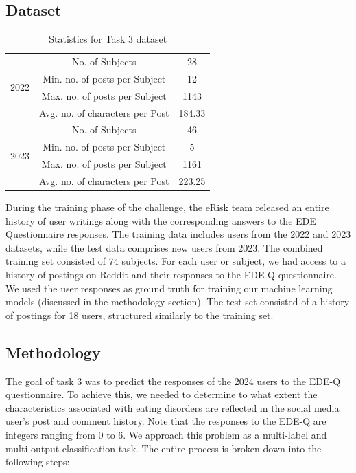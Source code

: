 \documentclass[]{style/ceurart}
\begin{document}
\subsection{Dataset}

\begin{table}[h!]
\centering
\caption{Statistics for Task 3 dataset}
\begin{tabular}{|c|c|c|}
\hline
\multirow{4}{*}{2022} & No. of Subjects                 & 28     \\ \cline{2-3} 
                      & Min. no. of posts per Subject   & 12     \\ \cline{2-3} 
                      & Max. no. of posts per Subject   & 1143   \\ \cline{2-3} 
                      & Avg. no. of characters per Post & 184.33 \\ \hline
\multirow{4}{*}{2023} & No. of Subjects                 & 46     \\ \cline{2-3} 
                      & Min. no. of posts per Subject   & 5      \\ \cline{2-3} 
                      & Max. no. of posts per Subject   & 1161   \\ \cline{2-3} 
                      & Avg. no. of characters per Post & 223.25 \\ \hline
\end{tabular}
\end{table}

During the training phase of the challenge, the eRisk team released an entire history of user writings along with the corresponding answers to the EDE Questionnaire responses. The training data includes users from the 2022 and 2023 datasets, while the test data comprises new users from 2023. The combined training set consisted of 74 subjects. For each user or subject, we had access to a history of postings on Reddit and their responses to the EDE-Q questionnaire. We used the user responses as ground truth for training our machine learning models (discussed in the methodology section). The test set consisted of a history of postings for 18 users, structured similarly to the training set.



\subsection{Methodology}

The goal of task 3 was to predict the responses of the 2024 users to the EDE-Q questionnaire. To achieve this, we needed to determine to what extent the characteristics associated with eating disorders are reflected in the social media user's post and comment history. Note that the responses to the EDE-Q are integers ranging from 0 to 6. We approach this problem as a multi-label and multi-output classification task. The entire process is broken down into the following steps:
\end{document}
